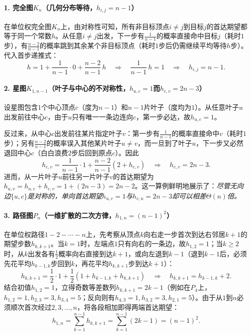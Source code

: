 \paragraph{1. 完全图$K_n$（几何分布等待，$h_{i,j}=n-1$）}

在单位权完全图$K_n$上，由对称性可知，所有非目标顶点$i\neq j$到目标$j$的首达期望都等于同一个常数$h$。从任意$i\neq j$出发，下一步有$\frac{1}{n-1}$的概率直接命中目标$j$（耗时$1$步），有$\frac{n-2}{n-1}$的概率跳到其余某个非目标顶点（耗时$1$步后仍需继续平均等待$h$步）。代入首步递推式：
\[
  h = 1 + \frac{1}{n-1}\cdot 0 + \frac{n-2}{n-1}\,h
  \quad\Longrightarrow\quad
  \frac{1}{n-1}\,h = 1
  \quad\Longrightarrow\quad
  h_{i,j} = n-1.
\]

\paragraph{2. 星图$K_{1,n-1}$（叶子与中心的不对称性，$h_{u,c}=1$而$h_{c,v}=2n-3$）}

设星图包含$1$个中心顶点$c$（度为$n-1$）和$n-1$片叶子（度均为$1$）。从任意叶子$u$出发前往中心$c$，由于$u$只有唯一一条边连向$c$，第一步必达，故$h_{u,c}=1$。

反过来，从中心$c$出发前往某片指定叶子$v$：第一步有$\frac{1}{n-1}$的概率直接命中$v$（耗时$1$步）；另有$\frac{n-2}{n-1}$的概率误入其他某片叶子$u\neq v$，而一旦到了叶子$u$，下一步又必然退回中心$c$（白白浪费$2$步后回到原点$c$）。因此
\[
  h_{c,v} = \frac{1}{n-1}\cdot 1 + \frac{n-2}{n-1}(2 + h_{c,v})
  \quad\Longrightarrow\quad
  h_{c,v} = 2n - 3.
\]
进而，从一片叶子$u$前往另一片叶子$v$的首达期望为$h_{u,v}=h_{u,c}+h_{c,v}=1+(2n-3)=2n-2$。这一算例鲜明地展示了：\emph{尽管无向边$\{u,c\}$是对称的，单向首达期望$h_{u,c}=1$与$h_{c,u}=2n-3$却可以相差$\Theta(n)$倍。}

\paragraph{3. 路径图$P_n$（一维扩散的二次方律，$h_{1,n}=(n-1)^2$）}

在单位权路径$1\!-\!2\!-\!\cdots\!-\!n$上，先考察从顶点$k$向右走一步首次到达右邻居$k+1$的期望步数$h_{k,k+1}$。当$k=1$时，左端点$1$只有向右的一条边，故$h_{1,2}=1$；当$k\geq 2$时，从$k$出发各有$\frac12$概率向右直接到达$k+1$，或向左退到$k-1$（退到$k-1$后，必须先花平均$h_{k-1,k}$步回到$k$，再花平均$h_{k,k+1}$步到达$k+1$）：
\[
  h_{k,k+1} = \frac12\cdot 1 + \frac12(1 + h_{k-1,k} + h_{k,k+1})
  \quad\Longrightarrow\quad
  h_{k,k+1} = h_{k-1,k} + 2.
\]
结合初值$h_{1,2}=1$，立得奇数等差数列$h_{k,k+1}=2k-1$（例如在$P_4$上，$h_{1,2}=1,h_{2,3}=3,h_{3,4}=5$；反向则有$h_{4,3}=1,h_{3,2}=3,h_{2,1}=5$）。由于从$1$到$n$必须顺次首次经过$2,3,\ldots,n$，将各段相加即得两端首达期望：
\begin{equation}
  h_{1,n} = \sum_{k=1}^{n-1} h_{k,k+1} = \sum_{k=1}^{n-1}(2k-1) = (n-1)^2.
  \label{eq:graph-walk-path-hitting}
\end{equation}

